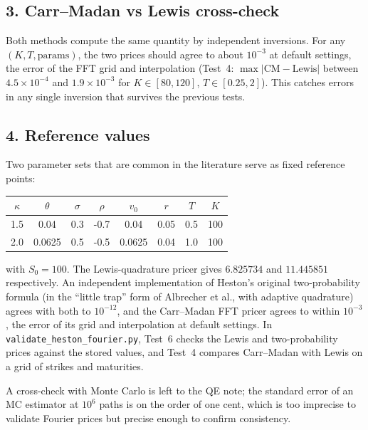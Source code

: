 \documentclass[11pt]{article}
\theoremstyle{plain}
\theoremstyle{definition}
\theoremstyle{remark}
\begin{document}
\subsection*{3. Carr--Madan vs Lewis cross-check}
Both methods compute the same quantity by independent inversions. For any \((K, T, \text{params})\), the two prices should agree to about \(10^{-3}\) at default settings, the error of the FFT grid and interpolation (Test~4: \(\max|\text{CM} - \text{Lewis}|\) between \(4.5 \times 10^{-4}\) and \(1.9 \times 10^{-3}\) for \(K \in [80, 120]\), \(T \in [0.25, 2]\)). This catches errors in any single inversion that survives the previous tests.

\subsection*{4. Reference values}
Two parameter sets that are common in the literature serve as fixed reference points:

\begin{center}
\begin{tabular}{cccccccc}
\toprule
\(\kappa\) & \(\theta\) & \(\sigma\) & \(\rho\) & \(v_0\) & \(r\) & \(T\) & \(K\) \\
\midrule
1.5 & 0.04 & 0.3 & -0.7 & 0.04 & 0.05 & 0.5 & 100 \\
2.0 & 0.0625 & 0.5 & -0.5 & 0.0625 & 0.04 & 1.0 & 100 \\
\bottomrule
\end{tabular}
\end{center}

with \(S_0 = 100\). The Lewis-quadrature pricer gives \(6.825734\) and \(11.445851\) respectively. An independent implementation of Heston's original two-probability formula (in the ``little trap'' form of Albrecher et al., with adaptive quadrature) agrees with both to \(10^{-12}\), and the Carr--Madan FFT pricer agrees to within \(10^{-3}\), the error of its grid and interpolation at default settings. In \texttt{validate\_heston\_fourier.py}, Test~6 checks the Lewis and two-probability prices against the stored values, and Test~4 compares Carr--Madan with Lewis on a grid of strikes and maturities.

A cross-check with Monte Carlo is left to the QE note; the standard error of an MC estimator at \(10^6\) paths is on the order of one cent, which is too imprecise to validate Fourier prices but precise enough to confirm consistency.

\end{document}
